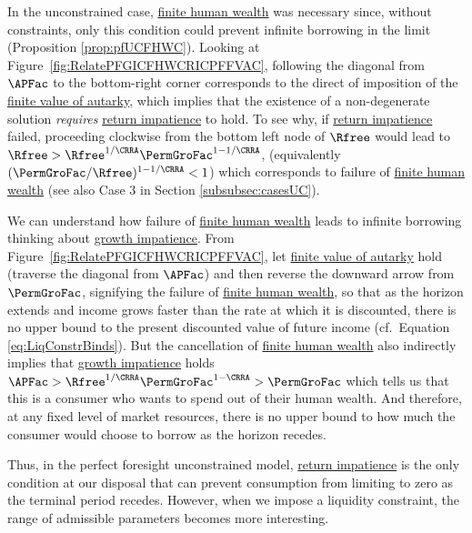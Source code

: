\documentclass[BufferStockTheory]{subfiles}
\begin{document}
In the unconstrained case, \hyperlink{FHWC}{finite human wealth} was necessary since, without constraints, only  this condition could prevent infinite borrowing in the limit (Proposition \ref{prop:pfUCFHWC}).
Looking at Figure~\ref{fig:RelatePFGICFHWCRICPFFVAC}, following the diagonal from $\APFac$ to the bottom-right corner corresponds to the direct of imposition of the \hyperlink{PFFVAC}{finite value of autarky}, which implies that the existence of a non-degenerate solution \textit{requires} \hyperlink{RIC}{return impatience} to hold.
To see why, if \hyperlink{RIC}{return impatience} failed, proceeding clockwise from the bottom left node of $\Rfree$ would lead to $\Rfree> \Rfree^{1/\CRRA}\PermGroFac^{1-1/\CRRA}$, (equivalently $(\PermGroFac/\Rfree)^{1-{1/\CRRA}}<1$) which corresponds to failure of \hyperlink{FHWC}{finite human wealth} (see also Case 3 in Section \ref{subsubsec:casesUC}).


We can understand how failure of \hyperlink{FHWC}{finite human wealth} leads to infinite borrowing thinking about \hyperlink{GIC}{growth impatience}.
From Figure~\ref{fig:RelatePFGICFHWCRICPFFVAC}, let \hyperlink{PFFVAC}{finite value of autarky} hold (traverse the diagonal from $\APFac$)  and then reverse the downward arrow from $\PermGroFac$, signifying the failure of \hyperlink{FHWC}{finite human wealth}, so that as the horizon extends and income grows faster than the rate at which it is discounted, there is no upper bound to the present discounted value of future income (cf.\ Equation \eqref{eq:LiqConstrBinds}).
But the cancellation of \hyperlink{FHWC}{finite human wealth} also indirectly implies that \hyperlink{GIC}{growth impatience} holds $\APFac > \Rfree^{1/\CRRA}\PermGroFac^{1-\CRRA} > \PermGroFac$ which tells us that this is a consumer who wants to spend out of their human wealth.
And therefore, at any fixed level of market resources, there is no upper bound to how much the consumer would choose to borrow as the horizon recedes.


\begin{comment}
An argument similar to the discussion pertaining to Equation \eqref{eq:LiqConstrBinds}, \textit{any} arbitrarily low (negative) constraint on $\bNrm_{t}$ becomes relevant.
Relaxing any constraint becomes always preferred and since income is guaranteed to grow faster than the rate of return, the consumer can continue to borrow without violating the no-ponzi condition (Equation \eqref{eq:NoDebtAtDeath}).
\end{comment}

Thus, in the perfect foresight unconstrained model, \hyperlink{RIC}{return impatience} is the only condition at our disposal that can prevent consumption from limiting to zero as the terminal period recedes.
However, when we impose a liquidity constraint, the range of admissible parameters becomes more interesting.
\end{document}
